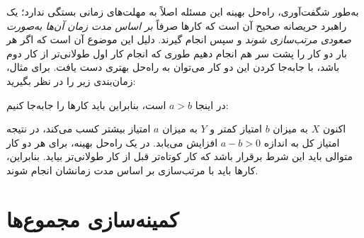 به‌طور شگفت‌آوری، راه‌حل بهینه این مسئله اصلاً به مهلت‌های زمانی بستگی ندارد؛ یک راهبرد حریصانه صحیح آن است که کارها صرفاً \emph{بر اساس مدت زمان آن‌ها به‌صورت صعودی مرتب‌سازی شوند} و سپس انجام گیرند.
دلیل این موضوع آن است که اگر هر بار دو کار را پشت سر هم انجام دهیم طوری که انجام کار اول طولانی‌تر از کار دوم باشد، با جابه‌جا کردن این دو کار می‌توان به راه‌حل بهتری دست یافت.
برای مثال، زمان‌بندی زیر را در نظر بگیرید:
\begin{center}
\end{center}
در اینجا $a>b$ است، بنابراین باید کارها را جابه‌جا کنیم:
\begin{center}
\end{center}
اکنون $X$ به میزان $b$ امتیاز کمتر و $Y$ به میزان $a$ امتیاز بیشتر کسب می‌کند، در نتیجه امتیاز کل به اندازه $a-b > 0$ افزایش می‌یابد.
در یک راه‌حل بهینه، برای هر دو کار متوالی باید این شرط برقرار باشد که کار کوتاه‌تر قبل از کار طولانی‌تر بیاید.
بنابراین، کارها باید با مرتب‌سازی بر اساس مدت زمانشان انجام شوند.

\section{کمینه‌سازی مجموع‌ها}

